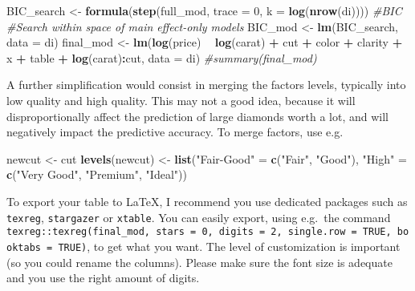 \documentclass[]{book}
\newenvironment{Shaded}{\begin{snugshade}}{\end{snugshade}}
\newcommand{\CommentTok}[1]{\textcolor[rgb]{0.56,0.35,0.01}{\textit{#1}}}
\newcommand{\DataTypeTok}[1]{\textcolor[rgb]{0.13,0.29,0.53}{#1}}
\newcommand{\DecValTok}[1]{\textcolor[rgb]{0.00,0.00,0.81}{#1}}
\newcommand{\KeywordTok}[1]{\textcolor[rgb]{0.13,0.29,0.53}{\textbf{#1}}}
\newcommand{\NormalTok}[1]{#1}
\newcommand{\OperatorTok}[1]{\textcolor[rgb]{0.81,0.36,0.00}{\textbf{#1}}}
\newcommand{\StringTok}[1]{\textcolor[rgb]{0.31,0.60,0.02}{#1}}
\theoremstyle{definition}
\theoremstyle{definition}
\theoremstyle{definition}
\theoremstyle{remark}
\begin{document}
\begin{Shaded}
\begin{Highlighting}[]
\NormalTok{BIC_search <-}\StringTok{ }\KeywordTok{formula}\NormalTok{(}\KeywordTok{step}\NormalTok{(full_mod, }\DataTypeTok{trace =} \DecValTok{0}\NormalTok{, }\DataTypeTok{k =} \KeywordTok{log}\NormalTok{(}\KeywordTok{nrow}\NormalTok{(di)))) }\CommentTok{#BIC}
\CommentTok{#Search within space of main effect-only models}
\NormalTok{BIC_mod <-}\StringTok{ }\KeywordTok{lm}\NormalTok{(BIC_search, }\DataTypeTok{data =}\NormalTok{ di) }
\NormalTok{final_mod <-}\StringTok{ }\KeywordTok{lm}\NormalTok{(}\KeywordTok{log}\NormalTok{(price) }\OperatorTok{~}\StringTok{ }\KeywordTok{log}\NormalTok{(carat) }\OperatorTok{+}\StringTok{ }\NormalTok{cut }\OperatorTok{+}\StringTok{ }\NormalTok{color }\OperatorTok{+}\StringTok{ }\NormalTok{clarity }\OperatorTok{+}\StringTok{ }
\StringTok{                  }\NormalTok{x }\OperatorTok{+}\StringTok{ }\NormalTok{table }\OperatorTok{+}\StringTok{ }\KeywordTok{log}\NormalTok{(carat)}\OperatorTok{:}\NormalTok{cut, }\DataTypeTok{data =}\NormalTok{ di)}
\CommentTok{#summary(final_mod)}
\end{Highlighting}
\end{Shaded}

A further simplification would consist in merging the factors levels, typically into low quality and high quality. This may not a good idea, because it will disproportionally affect the prediction of large diamonds worth a lot, and will negatively impact the predictive accuracy. To merge factors, use e.g.

\begin{Shaded}
\begin{Highlighting}[]
\NormalTok{newcut <-}\StringTok{ }\NormalTok{cut}
\KeywordTok{levels}\NormalTok{(newcut) <-}\StringTok{ }\KeywordTok{list}\NormalTok{(}\StringTok{"Fair-Good"}\NormalTok{ =}\StringTok{ }\KeywordTok{c}\NormalTok{(}\StringTok{"Fair"}\NormalTok{, }\StringTok{"Good"}\NormalTok{), }\StringTok{"High"}\NormalTok{ =}\StringTok{ }\KeywordTok{c}\NormalTok{(}\StringTok{"Very Good"}\NormalTok{, }\StringTok{"Premium"}\NormalTok{, }\StringTok{"Ideal"}\NormalTok{))}
\end{Highlighting}
\end{Shaded}

To export your table to \LaTeX, I recommend you use dedicated packages such as \texttt{texreg}, \texttt{stargazer} or \texttt{xtable}. You can easily export, using e.g.~the command \texttt{texreg::texreg(final\_mod,\ stars\ =\ 0,\ digits\ =\ 2,\ single.row\ =\ TRUE,\ booktabs\ =\ TRUE)}, to get what you want. The level of customization is important (so you could rename the columns). Please make sure the font size is adequate and you use the right amount of digits.
\end{document}
